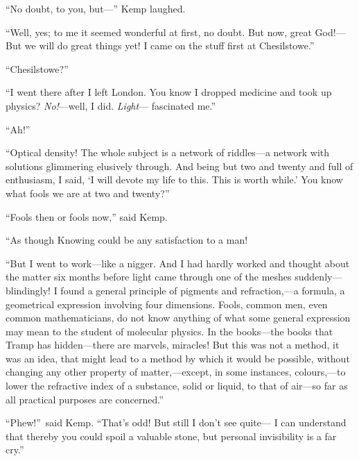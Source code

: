 “No doubt, to you, but—” Kemp laughed.

“Well, yes; to me it seemed wonderful at first, no doubt. But now, great God!— But we will do great things yet! I came on the stuff first at Chesilstowe.”

“Chesilstowe?”

“I went there after I left London. You know I dropped medicine and took up physics? \emph{No!}—well, I did. \emph{Light}— fascinated me.”

“Ah!”

“Optical density! The whole subject is a network of riddles—a network with solutions glimmering elusively through. And being but two and twenty and full of enthusiasm, I said, ‘I will devote my life to this. This is worth while.’ You know what fools we are at two and twenty?”

“Fools then or fools now,” said Kemp.

“As though Knowing could be any satisfaction to a man!

“But I went to work—like a nigger. And I had hardly worked and thought about the matter six months before light came through one of the meshes suddenly—blindingly! I found a general principle of pigments and refraction,—a formula, a geometrical expression involving four dimensions. Fools, common men, even common mathematicians, do not know anything of what some general expression may mean to the student of molecular physics. In the books—the books that Tramp has hidden—there are marvels, miracles! But this was not a method, it was an idea, that might lead to a method by which it would be possible, without changing any other property of matter,—except, in some instances, colours,—to lower the refractive index of a substance, solid or liquid, to that of air—so far as all practical purposes are concerned.”

“Phew!”\ said Kemp. “That’s odd! But still I don’t see quite— I can understand that thereby you could spoil a valuable stone, but personal invisibility is a far cry.”

